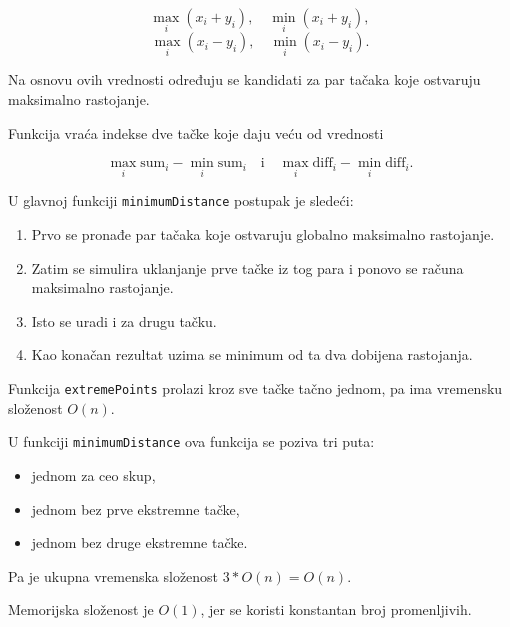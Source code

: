 \documentclass{article}
\begin{document}
\[
\max_i (x_i + y_i), \quad \min_i (x_i + y_i),
\]
\[
\max_i (x_i - y_i), \quad \min_i (x_i - y_i).
\]

Na osnovu ovih vrednosti određuju se kandidati za par tačaka koje ostvaruju maksimalno rastojanje.

Funkcija vraća indekse dve tačke koje daju veću od vrednosti

\[
\max_i \text{sum}_i - \min_i \text{sum}_i
\quad \text{i} \quad
\max_i \text{diff}_i - \min_i \text{diff}_i.
\]

U glavnoj funkciji \texttt{minimumDistance} postupak je sledeći:

\begin{enumerate}
    \item Prvo se pronađe par tačaka koje ostvaruju globalno maksimalno rastojanje.
    \item Zatim se simulira uklanjanje prve tačke iz tog para i ponovo se računa maksimalno rastojanje.
    \item Isto se uradi i za drugu tačku.
    \item Kao konačan rezultat uzima se minimum od ta dva dobijena rastojanja.
\end{enumerate}

Funkcija \texttt{extremePoints} prolazi kroz sve tačke tačno jednom, pa ima vremensku složenost $O(n)$.

U funkciji \texttt{minimumDistance} ova funkcija se poziva tri puta:
\begin{itemize}
    \item jednom za ceo skup,
    \item jednom bez prve ekstremne tačke,
    \item jednom bez druge ekstremne tačke.
\end{itemize}

Pa je ukupna vremenska složenost $3*O(n) = O(n)$.

Memorijska složenost je $O(1)$, jer se koristi konstantan broj promenljivih.
\end{document}
